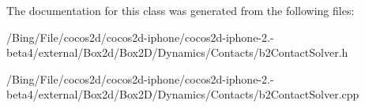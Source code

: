 The documentation for this class was generated from the following files\-:\begin{DoxyCompactItemize}
\item 
/\-Bing/\-File/cocos2d/cocos2d-\/iphone/cocos2d-\/iphone-\/2.-\/beta4/external/\-Box2d/\-Box2\-D/\-Dynamics/\-Contacts/b2\-Contact\-Solver.\-h\item 
/\-Bing/\-File/cocos2d/cocos2d-\/iphone/cocos2d-\/iphone-\/2.-\/beta4/external/\-Box2d/\-Box2\-D/\-Dynamics/\-Contacts/b2\-Contact\-Solver.\-cpp\end{DoxyCompactItemize}
